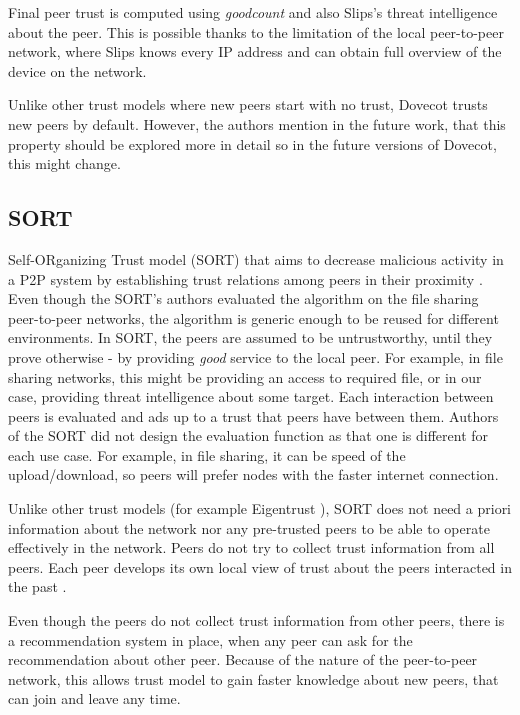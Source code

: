 Final peer trust is computed using \textit{goodcount} and also Slips's threat intelligence about the peer. 
This is possible thanks to the limitation of the local peer-to-peer network, where Slips knows every IP address and can obtain full overview of the device on the network.

Unlike other trust models where new peers start with no trust, Dovecot trusts new peers by default. 
However, the authors mention in the future work, that this property should be explored more in detail so in the future versions of Dovecot, this might change.

\subsection{SORT}
\label{subsec:sort}
Self-ORganizing Trust model (SORT) that aims to decrease malicious activity in a P2P system by establishing trust relations among peers in their proximity \cite{sort}.
Even though the SORT's authors evaluated the algorithm on the file sharing peer-to-peer networks, the algorithm is generic enough to be reused for different environments.
In SORT, the peers are assumed to be untrustworthy, until they prove otherwise - by providing \textit{good} service to the local peer. 
For example, in file sharing networks, this might be providing an access to required file, or in our case, providing threat intelligence about some target.
Each interaction between peers is evaluated and ads up to a trust that peers have between them. 
Authors of the SORT did not design the evaluation function as that one is different for each use case. 
For example, in file sharing, it can be speed of the upload/download, so peers will prefer nodes with the faster internet connection.

Unlike other trust models (for example Eigentrust \cite{kamvar2003eigentrust}), SORT does not need a priori information about the network nor any pre-trusted peers to be able to operate effectively in the network.
Peers do not try to collect trust information from all peers.
Each peer develops its own local view of trust about the peers interacted in the past \cite{sort}.

Even though the peers do not collect trust information from other peers, there is a recommendation system in place, when any peer can ask for the recommendation about other peer.
Because of the nature of the peer-to-peer network, this allows trust model to gain faster knowledge about new peers, that can join and leave any time.

